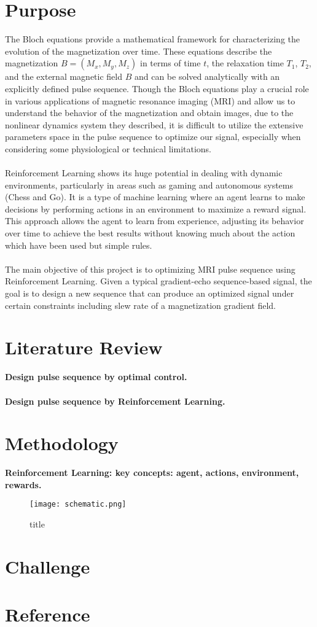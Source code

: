 \section{Purpose}
The Bloch equations provide a mathematical framework for characterizing the evolution of the magnetization over time. These equations describe the magnetization $B=(M_x, M_y, M_z)$ in terms of time $t$, the relaxation time $T_1$, $T_2$, and the external magnetic field $B$ and can be solved analytically with an explicitly defined pulse sequence. Though the Bloch equations play a crucial role in various applications of magnetic resonance imaging (MRI) and allow us to understand the behavior of the magnetization and obtain images, due to the nonlinear dynamics system they described, it is difficult to utilize the extensive parameters space in the pulse sequence to optimize our signal, especially when considering some physiological or technical limitations.
\\\\
Reinforcement Learning shows its huge potential in dealing with dynamic environments, particularly in areas such as gaming and autonomous systems (Chess and Go). It is a type of machine learning where an agent learns to make decisions by performing actions in an environment to maximize a reward signal. This approach allows the agent to learn from experience, adjusting its behavior over time to achieve the best results without knowing much about the action which have been used but simple rules.
\\\\
The main objective of this project is to optimizing MRI pulse sequence using Reinforcement Learning. Given a typical gradient-echo sequence-based signal, the goal is to design a new sequence that can produce an optimized signal under certain constraints including slew rate of a magnetization gradient field.

\section{Literature Review}
\textbf{Design pulse sequence by optimal control.}
\\\\
\textbf{Design pulse sequence by Reinforcement Learning.}

\section{Methodology}

\textbf{Reinforcement Learning: key concepts: agent, actions, environment, rewards.}

\begin{figure}[ht]
    \centering
    \texttt{[image: schematic.png]}
    \caption{title}
    \label{schematic}
\end{figure}

\section{Challenge}

\section{Reference}

